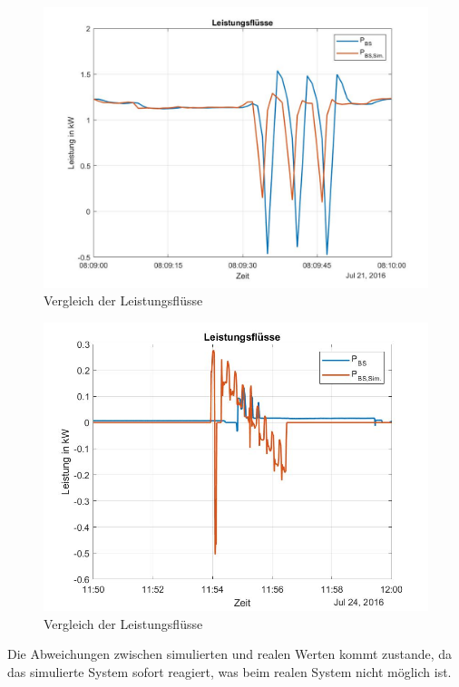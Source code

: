 \begin{figure}[H]
    \centering
    \includegraphics[width=\textwidth]{Abbildungen/8.09.jpg}
    \caption{Vergleich der Leistungsflüsse}
    \label{fig:plot1_230731}
\end{figure}

\begin{figure}[H]
    \centering
    \includegraphics[width=\textwidth]{Abbildungen/11.54.jpg}
    \caption{Vergleich der Leistungsflüsse}
    \label{fig:plot2_230731}
\end{figure}
Die Abweichungen zwischen simulierten und realen Werten kommt zustande, da das simulierte System sofort reagiert, was beim realen System nicht möglich ist.
\newpage

